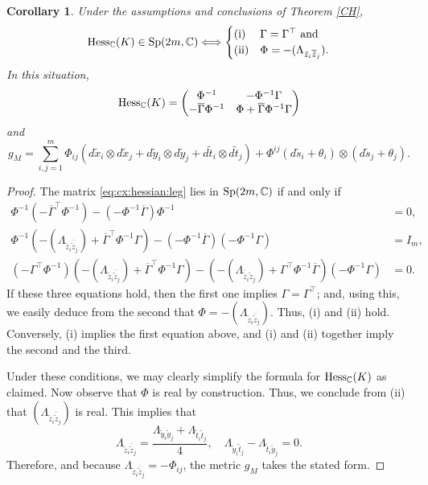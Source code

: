 \documentclass[11pt,reqno]{amsart}
\newcommand{\C}{\mathbb{C}}
\theoremstyle{plain}
\newtheorem{corollary}[theorem]{Corollary}
\theoremstyle{definition}
\numberwithin{equation}{section}
\begin{document}
\begin{corollary}\label{MAP}
Under the assumptions and conclusions of Theorem \ref{CH},
$${\rm Hess}_{\C}(K)\in {\rm Sp}(2m,\C) \Longleftrightarrow \begin{cases}
\textup{(i)} &\Gamma=\Gamma^{\top}\ \text{and}\\
\textup{(ii)} &\Phi=-(\Lambda_{\tilde{z}_{i}\overline{\tilde{z}}_{j}}).
\end{cases}
$$
In this situation,
$${\rm Hess}_{\C}(K)=\begin{pmatrix}
   \Phi^{-1}  & -\Phi^{-1}\Gamma   \\
   - \overline{\Gamma}\Phi^{-1}  & \Phi +\overline{\Gamma} \Phi^{-1} \Gamma
\end{pmatrix}$$
and
$$g_M = \sum_{i,j=1}^m \Phi_{ij} (d\tilde{x}_{i}\otimes d\tilde{x}_{j}+d\tilde{y}_{i}\otimes d\tilde{y}_{j} + d\tilde{t}_{i} \otimes d\tilde{t}_{j}) + \Phi^{ij}(d\tilde{s}_{i}+\theta_{i})\otimes(d\tilde{s}_{j}+\theta_{j}).$$
\end{corollary}

\begin{proof}
The matrix \eqref{eq:cx:hessian:leg} lies in ${\rm Sp}(2m,\mathbb{C})$ if and only if
\begin{align}
\label{SP1}
   \Phi^{-1}(-\overline{\Gamma}^\top \Phi^{-1}) - (-\Phi^{-1}\overline{\Gamma})\Phi^{-1}& = 0,\\
    \label{SP2}
    \Phi^{-1}(-(\Lambda_{\tilde{z}_{i}{\overline{\tilde{z}}}_{j}}) +\overline{\Gamma}^{\top} \Phi^{-1} \Gamma) - (-\Phi^{-1}\overline{\Gamma})(-\Phi^{-1}\Gamma) & =  I_m,\\
\label{SP3}
    (-\Gamma^\top \Phi^{-1})(-(\Lambda_{\tilde{z}_{i}{\overline{\tilde{z}}}_{j}}) +\overline{\Gamma}^{\top} \Phi^{-1} \Gamma) - (-(\Lambda_{\overline{\tilde{z}}_{i}{{\tilde{z}}}_{j}}) +\Gamma^{\top} \Phi^{-1} \overline{\Gamma})(-\Phi^{-1}\Gamma) &=  0.
\end{align}
If these three equations hold, then the first one implies $\Gamma = \Gamma^\top$; and, using this, we easily deduce from the second that $\Phi=-(\Lambda_{\tilde{z}_{i}\overline{\tilde{z}}_{j}})$. Thus, (i) and (ii) hold. Conversely, (i) implies the first equation above, and (i) and (ii) together imply the second and the third.

Under these conditions, we may clearly simplify the formula for ${\rm Hess}_{\C}(K)$ as claimed. Now observe that $\Phi$ is real by construction. Thus, we conclude from (ii) that $(\Lambda_{\tilde{z}_{i}\overline{\tilde{z}}_{j}})$ is real. This implies that
$$\Lambda_{\tilde{z}_{i}\overline{\tilde{z}}_{j}}=\frac{\Lambda_{\tilde{y}_{i}\tilde{y}_{j}}+\Lambda_{\tilde{t}_{i}\tilde{t}_{j}}}{4} ,\quad  \Lambda_{\tilde{y}_{i}\tilde{t}_{j}}-\Lambda_{\tilde{t}_{i}\tilde{y}_{j}}=0.$$
Therefore, and because $\Lambda_{\tilde{z}_{i}\overline{\tilde{z}}_{j}} = -\Phi_{ij}$, the metric $g_M$ takes the stated form.
\end{proof}
\end{document}
